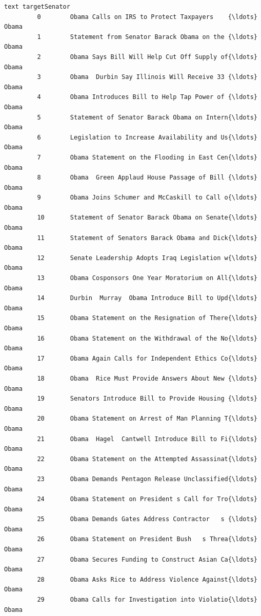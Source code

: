\documentclass[11pt]{article}
\begin{document}
\begin{Verbatim}[commandchars=\\\{\}]
                                                            text targetSenator  
         0        Obama Calls on IRS to Protect Taxpayers    {\ldots}         Obama  
         1        Statement from Senator Barack Obama on the {\ldots}         Obama  
         2        Obama Says Bill Will Help Cut Off Supply of{\ldots}         Obama  
         3        Obama  Durbin Say Illinois Will Receive 33 {\ldots}         Obama  
         4        Obama Introduces Bill to Help Tap Power of {\ldots}         Obama  
         5        Statement of Senator Barack Obama on Intern{\ldots}         Obama  
         6        Legislation to Increase Availability and Us{\ldots}         Obama  
         7        Obama Statement on the Flooding in East Cen{\ldots}         Obama  
         8        Obama  Green Applaud House Passage of Bill {\ldots}         Obama  
         9        Obama Joins Schumer and McCaskill to Call o{\ldots}         Obama  
         10       Statement of Senator Barack Obama on Senate{\ldots}         Obama  
         11       Statement of Senators Barack Obama and Dick{\ldots}         Obama  
         12       Senate Leadership Adopts Iraq Legislation w{\ldots}         Obama  
         13       Obama Cosponsors One Year Moratorium on All{\ldots}         Obama  
         14       Durbin  Murray  Obama Introduce Bill to Upd{\ldots}         Obama  
         15       Obama Statement on the Resignation of There{\ldots}         Obama  
         16       Obama Statement on the Withdrawal of the No{\ldots}         Obama  
         17       Obama Again Calls for Independent Ethics Co{\ldots}         Obama  
         18       Obama  Rice Must Provide Answers About New {\ldots}         Obama  
         19       Senators Introduce Bill to Provide Housing {\ldots}         Obama  
         20       Obama Statement on Arrest of Man Planning T{\ldots}         Obama  
         21       Obama  Hagel  Cantwell Introduce Bill to Fi{\ldots}         Obama  
         22       Obama Statement on the Attempted Assassinat{\ldots}         Obama  
         23       Obama Demands Pentagon Release Unclassified{\ldots}         Obama  
         24       Obama Statement on President s Call for Tro{\ldots}         Obama  
         25       Obama Demands Gates Address Contractor   s {\ldots}         Obama  
         26       Obama Statement on President Bush   s Threa{\ldots}         Obama  
         27       Obama Secures Funding to Construct Asian Ca{\ldots}         Obama  
         28       Obama Asks Rice to Address Violence Against{\ldots}         Obama  
         29       Obama Calls for Investigation into Violatio{\ldots}         Obama  

\end{Verbatim}
\end{document}
